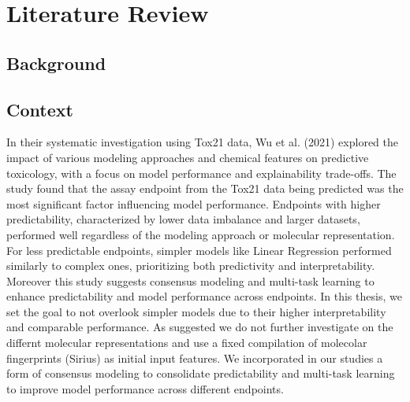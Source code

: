 \chapter{Literature Review}\label{sec:literature}
\section{Background}
\section{Context}

In their systematic investigation using Tox21 data, Wu et al. (2021) explored the impact of various modeling approaches and chemical features on predictive toxicology, with a focus on model performance and explainability trade-offs. The study found that the assay endpoint from the Tox21 data being predicted was the most significant factor influencing model performance. Endpoints with higher predictability, characterized by lower data imbalance and larger datasets, performed well regardless of the modeling approach or molecular representation. For less predictable endpoints, simpler models like Linear Regression performed similarly to complex ones, prioritizing both predictivity and interpretability. Moreover this study suggests consensus modeling and multi-task learning to enhance predictability and model performance across endpoints. In this thesis, we set the goal to not overlook simpler models due to their higher interpretability and comparable performance. As suggested we do not further investigate on the differnt molecular representations and use a fixed compilation of molecolar fingerprints (Sirius) as initial input features. We incorporated in our studies a form of consensus modeling to consolidate predictability and multi-task learning to improve model performance across different endpoints.
